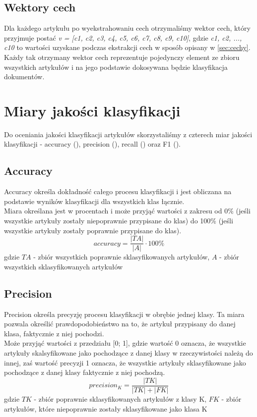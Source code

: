 \documentclass{article}
\begin{document}
\subsection{Wektory cech} \label{sec:wektor}
Dla każdego artykułu po wyekstrahowaniu cech otrzymaliśmy wektor cech, który przyjmuje postać \textit{v = [c1, c2, c3, c4, c5, c6, c7, c8, c9, c10]}, gdzie \textit{c1, c2, ..., c10} to wartości uzyskane podczas ekstrakcji cech w sposób opisany w \ref{sec:cechy}. Każdy tak otrzymany wektor cech reprezentuje pojedynczy element ze zbioru wszystkich artykułów i na jego podstawie dokosywana będzie klasyfikacja dokumentów.



\section{Miary jakości klasyfikacji} 
Do oceniania jakości klasyfikacji artykułów skorzystaliśmy z czterech miar jakości klasyfikacji - accuracy (\cite{tabpom}), precision (\cite{tabpom}), recall (\cite{tabpom}) oraz F1 (\cite{miary}).
\subsection{Accuracy}
Accuracy określa dokładność całego procesu klasyfikacji i jest obliczana na podstawie wyników klasyfikacji dla wszystkich klas łącznie. 
\\Miara określana jest w procentach i może przyjąć wartości z zakresu od 0\% (jeśli wszystkie artykuły zostały niepoprawnie przypisane do klas) do 100\% (jeśli wszystkie artykuły zostały poprawnie przypisane do klas).
\begin{equation}
     accuracy = \frac{\left|TA \right|}{\left| A\right|} \cdot 100\%
\end{equation}
gdzie \(TA\) - zbiór wszystkich poprawnie sklasyfikowanych artykułów, \(A\) - zbiór wszystkich sklasyfikowanych artykułów
\subsection{Precision} \label{sec:precision}
Precision określa precyzję procesu klasyfikacji w obrębie jednej klasy. Ta miara pozwala określić prawdopodobieństwo na to, że artykuł przypisany do danej klasa, faktycznie z niej pochodzi. 
\\Może przyjąć wartości z przedziału [0; 1], gdzie wartość 0 oznacza, że wszystkie artykuły skalsyfikowane jako pochodzące z danej klasy w rzeczywistości należą do innej, zaś wartość precyzji 1 oznacza, że wszystkie artykuły sklasyfikowane jako pochodzące z danej klasy faktycznie z niej pochodzą.
\begin{equation} \label{eq:precision}
     precision_K = \frac{\left|TK \right|}{\left|TK\right| + \left|FK\right|}
\end{equation}
gdzie \(TK\) - zbiór poprawnie sklasyfikowanych artykułów z klasy K, \(FK\) - zbiór artykułów, które niepoprawnie zostały sklasyfikowane jako klasa K
\end{document}
